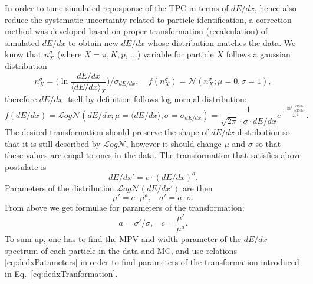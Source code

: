 In order to tune simulated reposponse of the TPC in terms of $dE/dx$, hence also reduce the systematic uncertainty related to particle identification, a correction method was developed based on proper transformation (recalculation) of simulated $dE/dx$ to obtain new $dE/dx$ whose distribution matches the data.
We know that $n^{\sigma}_{X}$ (where $X=\pi, K, p$, ...) variable for particle $X$ follows a gaussian distribution\vspace{-2pt}%
\begin{equation}n^{\sigma}_{X} = \Big( \ln{\frac{dE/dx}{\langle dE/dx\rangle_{X}}} \Big) / \sigma_{dE/dx},~~~~~f(n^{\sigma}_{X}) = \mathcal{N}(n^{\sigma}_{X}; \mu=0,\sigma=1),\end{equation}\vspace{-2pt}
therefore $dE/dx$ itself by definition follows log-normal distribution:\vspace{-2pt}%
\begin{equation}f(dE/dx) = \mathcal{L}og\mathcal{N}(dE/dx; \mu=\langle dE/dx\rangle,\sigma=\sigma_{dE/dx}) = \frac{1}{\sqrt{2\pi}\cdot \sigma\cdot dE/dx}e^{-\frac{\ln^{2}{\frac{dE/dx}{\langle dE/dx\rangle}}}{2\sigma^{2}}}.\end{equation}\vspace{-2pt}%
The desired transformation should preserve the shape of $dE/dx$ distribution so that it is still described by $\mathcal{L}og\mathcal{N}$, however it should change $\mu$ and $\sigma$ so that these values are euqal to ones in the data. The transformation that satisfies above postulate is\vspace{-2pt}%
\begin{equation}dE/dx' = c\cdot (dE/dx)^{a}.\label{eq:dedxTranformation}\end{equation}\vspace{-2pt}%
Parameters of the distribution $\mathcal{L}og\mathcal{N}(dE/dx')$ are then\vspace{-2pt}%
\begin{equation}\mu' = c\cdot\mu^{a},~~~~\sigma' = a\cdot\sigma.\end{equation}\vspace{-2pt}%
From above we get formulae for parameters of the transformation:\vspace{-2pt}%
\begin{equation}a=\sigma'/\sigma,~~~~c = \frac{\mu'}{\mu^{a}}.\label{eq:dedxPatameters}\end{equation}%
%
To sum up, one has to find the MPV and width parameter of the $dE/dx$ spectrum of each particle in the data and MC, and use relations \eqref{eq:dedxPatameters} in order to find parameters of the transformation introduced in Eq.~\eqref{eq:dedxTranformation}.

